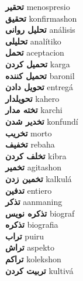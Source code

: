 \textbf{ تحقیر  } menospresio \\
\textbf{ تحقیق  } konfirmashon \\
\textbf{ تحلیل روانی  } análisis \\
\textbf{ تحلیلی  } analítiko \\
\textbf{ تحمل  } aceptacion \\
\textbf{ تحمیل کردن  } karga \\
\textbf{ تحمیل کننده  } baronil \\
\textbf{ تحویل دادن  } entregá \\
\textbf{ تحویلدار  } kahero \\
\textbf{ تخته مدار  } karchi \\
\textbf{ تخدیر شدن  } konfundí \\
\textbf{ تخریب  } morto \\
\textbf{ تخفیف  } rebaha \\
\textbf{ تخلف کردن  } kibra \\
\textbf{ تخمیر  } agitashon \\
\textbf{ تخمین زدن  } kalkulá \\
\textbf{ تدفین  } entiero \\
\textbf{ تذکر  } aanmaning \\
\textbf{ تذکره نویس  } biograf \\
\textbf{ تذکره  } biografia \\
\textbf{ تراب  } puiru \\
\textbf{ تراش  } aspekto \\
\textbf{ تراکم  } kolekshon \\
\textbf{ تربیت کردن  } kultivá \\
